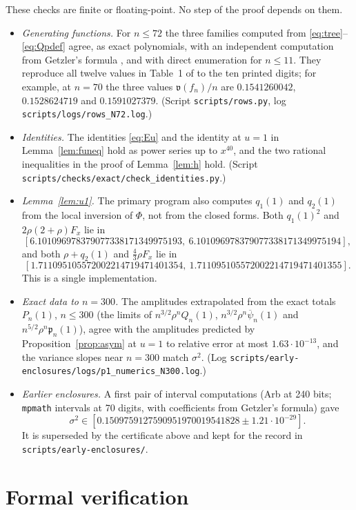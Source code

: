 \documentclass[11pt]{amsart}
\theoremstyle{definition}
\theoremstyle{remark}
\numberwithin{equation}{section}
\newcommand{\var}{\mathfrak{v}}
\newcommand{\pp}{\mathfrak{p}}
\newcommand{\psibar}{\overline{\psi}}
\begin{document}
These checks are finite or floating-point. No step of the proof depends on them.
\begin{itemize}
\item \emph{Generating functions.} For \(n\le72\) the three families computed from \eqref{eq:tree}--\eqref{eq:Qpdef} agree, as exact polynomials, with an independent computation from Getzler's formula \cite[Thms.~5.7, 5.9]{Ge}, and with direct enumeration for \(n\le11\). They reproduce all twelve values in Table~1 of \cite{CK} to the ten printed digits; for example, at \(n=70\) the three values \(\var(f_n)/n\) are \(0.1541260042\), \(0.1528624719\) and \(0.1591027379\). (Script \nolinkurl{scripts/rows.py}, log \nolinkurl{scripts/logs/rows_N72.log}.)
\item \emph{Identities.} The identities \eqref{eq:Eu} and the identity at \(u=1\) in Lemma~\ref{lem:funeq} hold as power series up to \(x^{40}\), and the two rational inequalities in the proof of Lemma~\ref{lem:h} hold. (Script \nolinkurl{scripts/checks/exact/check_identities.py}.)
\item \emph{Lemma~\ref{lem:u1}.} The primary program also computes \(q_1(1)\) and \(q_2(1)\) from the local inversion of \(\Phi\), not from the closed forms. Both \(q_1(1)^2\) and \(2\rho(2+\rho)F_x\) lie in
\[
[6.101096978379077338171349975193,\ 6.101096978379077338171349975194],
\]
and both \(\rho+q_2(1)\) and \(\frac43\rho F_x\) lie in
\[
[1.711095105572002214719471401354,\ 1.711095105572002214719471401355].
\]
This is a single implementation.
\item \emph{Exact data to \(n=300\).} The amplitudes extrapolated from the exact totals \(P_n(1)\), \(n\le300\) (the limits of \(n^{3/2}\rho^nQ_n(1)\), \(n^{3/2}\rho^n\psibar_n(1)\) and \(n^{5/2}\rho^n\pp_n(1)\)), agree with the amplitudes predicted by Proposition~\ref{prop:asym} at \(u=1\) to relative error at most \(1.63\cdot10^{-13}\), and the variance slopes near \(n=300\) match \(\sigma^2\). (Log \nolinkurl{scripts/early-enclosures/logs/p1_numerics_N300.log}.)
\item \emph{Earlier enclosures.} A first pair of interval computations (Arb at 240 bits; \texttt{mpmath} intervals at 70 digits, with coefficients from Getzler's formula) gave
\[
\sigma^2\in[0.1509759127590951970019541828\pm1.21\cdot10^{-29}].
\]
It is superseded by the certificate above and kept for the record in \nolinkurl{scripts/early-enclosures/}.
\end{itemize}

\section{Formal verification}\label{sec:lean}
\end{document}

